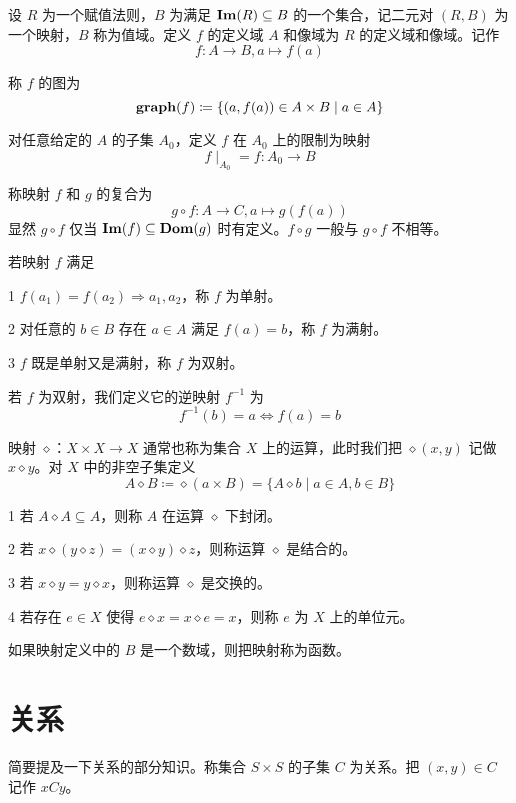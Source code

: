 \begin{definition}
	设 $R$ 为一个赋值法则，$B$ 为满足 $\operatorname{\mathbf{Im}}(R) \subseteq B$ 的一个集合，记二元对 $(R,B)$ 为一个映射，$B$ 称为值域。定义 $f$ 的定义域 $A$ 和像域为 $R$ 的定义域和像域。记作
	$$f:A\to B, a\mapsto f(a)$$
\end{definition}

称 $f$ 的图为
$$\operatorname{\mathbf{graph}}(f) \coloneqq  \{(a,f(a)) \in A\times B \mid a \in A\}$$

对任意给定的 $A$ 的子集 $A_0$，定义 $f$ 在 $A_0$ 上的限制为映射
$$f \mid_{A_0} = f : A_0 \to B$$

称映射 $f$ 和 $g$ 的复合为
$$g\circ f: A \to C, a \mapsto g(f(a))$$
显然 $g \circ f$ 仅当 $\operatorname{\mathbf{Im}}(f) \subseteq \operatorname{\mathbf{Dom}}(g)$ 时有定义。$f\circ g$ 一般与 $g \circ f$ 不相等。

若映射 $f$ 满足

\num{1} $f(a_1) = f(a_2) \Rightarrow a_1,a_2$，称 $f$ 为单射。

\num{2} 对任意的 $b\in B$ 存在 $a\in A$ 满足 $f(a)=b$，称 $f$ 为满射。

\num{3} $f$ 既是单射又是满射，称 $f$ 为双射。

若 $f$ 为双射，我们定义它的逆映射 $f^{-1}$ 为
$$f^{-1}(b) =  a \Leftrightarrow f(a) = b$$

映射 $\diamond$：$X\times X \to X$ 通常也称为集合 $X$ 上的运算，此时我们把 $\diamond(x,y)$ 记做 $x \diamond y$。对 $X$ 中的非空子集定义
$$A \diamond B \coloneqq  \diamond(a\times B) = \{A \diamond b \mid a \in A, b\in B\}$$

\begin{definition}
	\num{1} 若 $A \diamond A \subseteq A$，则称 $A$ 在运算 $\diamond$ 下封闭。

	\num{2} 若 $x \diamond (y \diamond z) = (x \diamond y) \diamond z$，则称运算 $\diamond$ 是结合的。

	\num{3} 若 $x \diamond y = y \diamond x$，则称运算 $\diamond$ 是交换的。

	\num{4} 若存在 $e \in X$ 使得 $e \diamond x = x \diamond e = x$，则称 $e$ 为 $X$ 上的单位元。
\end{definition}

如果映射定义中的 $B$ 是一个数域，则把映射称为函数。

\section{关系}

简要提及一下关系的部分知识。称集合 $S\times S$ 的子集 $C$ 为关系。把 $(x,y)\in C$ 记作 $xCy$。

